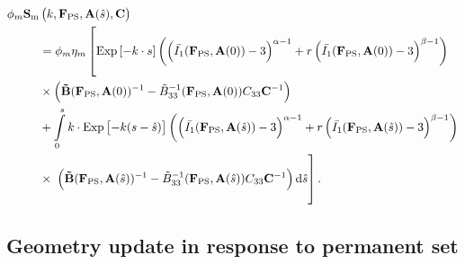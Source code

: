 \begin{equation} \label{c6:eq:fullmatrix}
\begin{split}
\phi_m \mathbf{S}_\mathrm{m}&\left(k , \mathbf{F}_\mathrm{PS}, \mathbf{A}(\hat{s}), \mathbf{C}\right) \\
&= \phi_m \eta_m \left[ \vphantom{\int\displaylimits_0^s} \mathrm{Exp}\left[-k  \cdot s\right]  \left(\left( \bar{I_1} (\mathbf{F}_\mathrm{PS}, \mathbf{A}(0)) - 3\right)^{\alpha - 1} + r \left( \bar{I_1} (\mathbf{F}_\mathrm{PS}, \mathbf{A}(0)) - 3\right)^{\beta - 1}\right)  \right.\\
&\times \left( \mathbf{\tilde{B}}(\mathbf{F}_\mathrm{PS}, \mathbf{A}(0))^{-1} - \tilde{B}_{33}^{-1}(\mathbf{F}_\mathrm{PS}, \mathbf{A}(0))C_{33}\mathbf{C}^{-1}\right) \\
&+ \int\displaylimits_0^s k \cdot \mathrm{Exp}\left[-k (s - \hat{s})\right] \left(\left( \bar{I_1} (\mathbf{F}_\mathrm{PS}, \mathbf{A}(\hat{s})) - 3\right)^{\alpha - 1} + r \left( \bar{I_1} (\mathbf{F}_\mathrm{PS}, \mathbf{A}(\hat{s})) - 3\right)^{\beta - 1}\right) \\
&\times \left. \vphantom{\int\displaylimits_-^s} \left( \mathbf{\tilde{B}}(\mathbf{F}_\mathrm{PS}, \mathbf{A}(\hat{s}))^{-1} - \tilde{B}_{33}^{-1}(\mathbf{F}_\mathrm{PS}, \mathbf{A}(\hat{s}))C_{33}\mathbf{C}^{-1}\right) \mathrm{d}\hat{s}\right].
\end{split}
\end{equation}

\subsection{Geometry update in response to permanent set}

